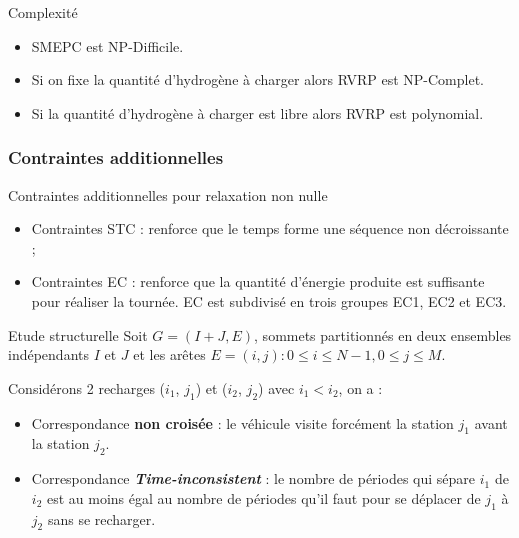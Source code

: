 \documentclass[hyperref={bookmarks=false},aspectratio=169]{beamer}
\begin{document}
\begin{frame}
\begin{block}{Complexité}
\begin{itemize}
\item SMEPC est NP-Difficile.
 \item  Si on fixe la quantité d'hydrogène à charger alors RVRP est NP-Complet.
 \item Si la quantité d'hydrogène à charger est libre alors RVRP est polynomial.
 \end{itemize}
 \end{block}

\end{frame}
\begin{frame}
\frametitle{ Contraintes additionnelles}

\begin{alertblock}{Contraintes additionnelles pour relaxation non nulle}
\begin{itemize}
\item Contraintes STC : renforce que le temps forme une séquence non décroissante ;
\item Contraintes EC : renforce que la quantité d'énergie produite est suffisante pour réaliser la tournée. EC est subdivisé en trois groupes EC1, EC2 et EC3.

\end{itemize}
\end{alertblock}
\pause

\begin{block}{Etude structurelle}
Soit $G = (I +J, E)$, sommets partitionnés en deux ensembles indépendants $I$ et $J$ et les arêtes $E = {(i, j) : 0 \leq i \leq N - 1, 0 \leq j \leq M}$.

Considérons 2 recharges ($i_1$, $j_1$) et ($i_2$, $j_2$) avec  $i_1<i_2$, on a :
\begin{itemize}
\item Correspondance \textbf{non croisée} : le véhicule visite forcément la station $j_1$ avant la station $j_2$.
\item	Correspondance \textbf{\textit{Time-inconsistent}} : le nombre de périodes qui sépare $i_1$ de $i_2$ est au moins égal au nombre de périodes qu'il faut pour se déplacer de $j_1$ à $j_2$ sans se recharger.
\end{itemize}
\end{block}
\end{frame}
\end{document}
